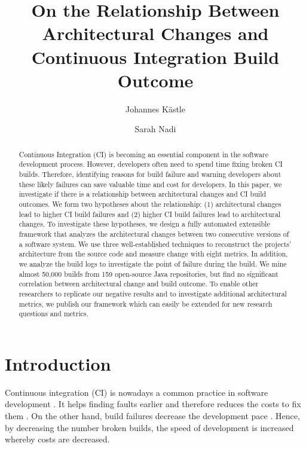 \documentclass[sigplan, anonymous, review]{acmart}
\begin{document}
\title[Architectural Change vs CI Build Outcome]{On the Relationship Between Architectural Changes and Continuous Integration Build Outcome
}

\author{Johannes K{\"a}stle}

\author{Sarah Nadi}

\begin{abstract}
Continuous Integration (CI) is becoming an essential component in the software development process.
However, developers often need to spend time fixing broken CI builds.
Therefore, identifying reasons for build failure and warning developers about these likely failures can save valuable time and cost for developers.
In this paper, we investigate if there is a relationship between architectural changes and CI build outcomes.
We form two hypotheses about the relationship: (1) architectural changes lead to higher CI build failures and (2) higher CI build failures lead to architectural changes.
To investigate these hypotheses, we design a fully automated extensible framework that analyzes the architectural changes between two consecutive versions of a software system.
We use three well-established techniques to reconstruct the projects' architecture from the source code and measure change with eight metrics. 
In addition, we analyze the build logs to investigate the point of failure during the build. 
We mine almost 50,000 builds from 159 open-source Java repositories, but find no significant correlation between architectural change and build outcome. 
To enable other researchers to replicate our negative results and to investigate additional architectural metrics, we publish our framework which can easily be extended for new research questions and metrics.
\end{abstract}

\maketitle

\section{Introduction}

Continuous integration (CI) is nowadays a common practice in software development \cite{CI-Common}. It helps finding faults earlier and therefore reduces the costs to fix them \cite{NutzenCI}. On the other hand, build failures decrease the development pace \cite{Costs-BuildFailures}. Hence, by decreasing the number broken builds, the speed of development is increased whereby costs are decreased.
\end{document}
